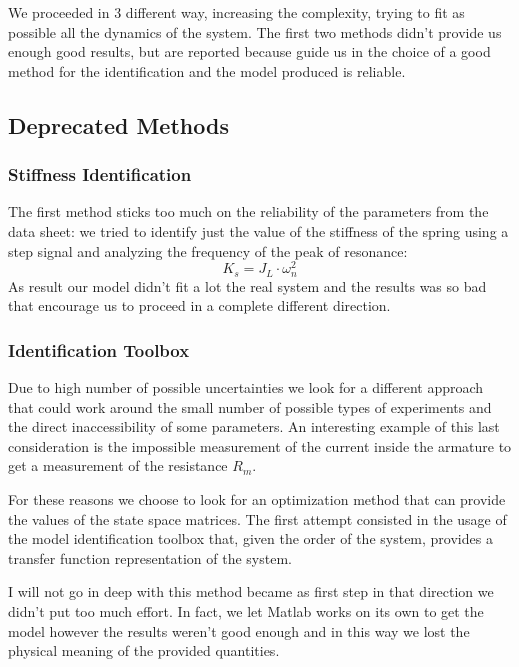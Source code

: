         We proceeded in 3 different way, increasing the complexity, trying to fit as possible all the dynamics of the system. The first two methods didn't provide us enough good results, but are reported because guide us in the choice of a good method for the identification and the model produced is reliable. 
        
        \subsection{Deprecated Methods}
            \subsubsection{Stiffness Identification}
                    
                The first method sticks too much on the reliability of the parameters from the data sheet: we tried to identify just the value of the stiffness of the spring using a step signal and analyzing the frequency of the peak of resonance:
                \[
                    K_s = J_L \cdot \omega_n^2\]
                As result our model didn't fit a lot the real system and the results was so bad that encourage us to proceed in a complete different direction.

            \subsubsection{Identification Toolbox}

                Due to high number of possible uncertainties we look for a different approach that could work around the small number of possible types of experiments and the direct inaccessibility of some parameters. An interesting example of this last consideration is the impossible measurement of the current inside the armature to get a measurement of the resistance $R_m$.

                For these reasons we choose to look for an optimization method that can provide the values of the state space matrices. The first attempt consisted in the usage of the model identification toolbox that, given the order of the system, provides a transfer function representation of the system. 
                
                I will not go in deep with this method became as first step in that direction we didn't put too much effort. In fact, we let Matlab works on its own to get the model however the results weren't good enough and in this way we lost the physical meaning of the provided quantities.

